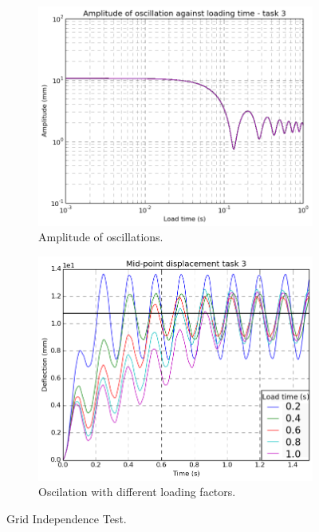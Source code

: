 \documentclass[10pt, a4paper]{article}
\begin{document}
\begin{figure}[!htb]
\centering
\begin{subfigure}{.5\textwidth}
  \centering
  \includegraphics[width=1\linewidth]{task3_amplitude}
  \caption{Amplitude of oscillations.}
  \label{fig:amplitude3}
\end{subfigure}%
\begin{subfigure}{.5\textwidth}
  \centering
  \includegraphics[width=1\linewidth]{task3_deflection}
  \caption{Oscilation with different loading factors.}
  \label{fig:deflection3}
\end{subfigure}
\caption{Grid Independence Test.}
\label{fig:task3}
\end{figure}
\end{document}
